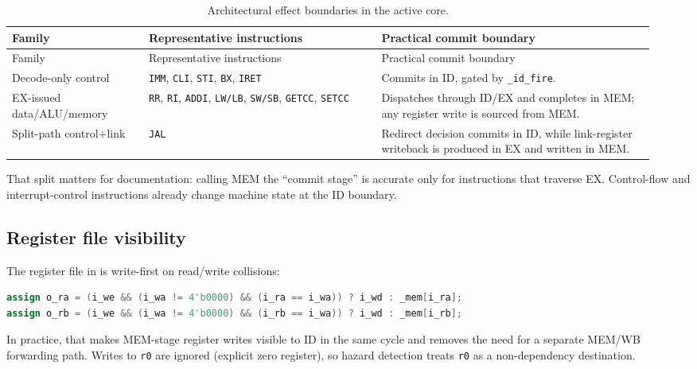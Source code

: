 \documentclass[11pt,a4paper]{article}
\begin{document}
\begin{longtable}{@{}>{\ttfamily}p{0.20\linewidth}p{0.34\linewidth}p{0.40\linewidth}@{}}
\caption{Architectural effect boundaries in the active core.}\\
\toprule
Family & Representative instructions & Practical commit boundary \\
\midrule
\endfirsthead

\toprule
Family & Representative instructions & Practical commit boundary \\
\midrule
\endhead

\bottomrule
\endfoot

Decode-only control & \texttt{IMM}, \texttt{CLI}, \texttt{STI}, \texttt{BX}, \texttt{IRET} & Commits in ID, gated by \texttt{\_id\_fire}. \\
EX-issued data/ALU/memory & \texttt{RR}, \texttt{RI}, \texttt{ADDI}, \texttt{LW/LB}, \texttt{SW/SB}, \texttt{GETCC}, \texttt{SETCC} & Dispatches through ID/EX and completes in MEM; any register write is sourced from MEM. \\
Split-path control+link & \texttt{JAL} & Redirect decision commits in ID, while link-register writeback is produced in EX and written in MEM. \\
\end{longtable}

That split matters for documentation: calling MEM the ``commit stage'' is accurate only for instructions that traverse EX. Control-flow and interrupt-control instructions already change machine state at the ID boundary.

\subsection{Register file visibility}

The register file in  is write-first on read/write collisions:
\begin{lstlisting}[language=Verilog]
assign o_ra = (i_we && (i_wa != 4'b0000) && (i_ra == i_wa)) ? i_wd : _mem[i_ra];
assign o_rb = (i_we && (i_wa != 4'b0000) && (i_rb == i_wa)) ? i_wd : _mem[i_rb];
\end{lstlisting}
In practice, that makes MEM-stage register writes visible to ID in the same cycle and removes the need for a separate MEM/WB forwarding path.\cite{stanfordhazards} Writes to \texttt{r0} are ignored (explicit zero register), so hazard detection treats \texttt{r0} as a non-dependency destination.
\end{document}
